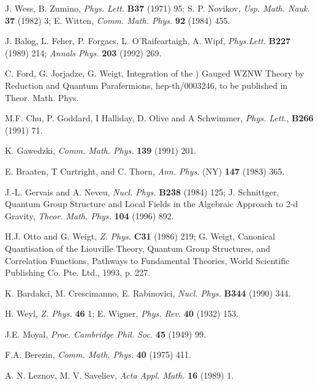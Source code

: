 \documentclass[a4paper,12pt]{article}
\providecommand{\rr}{\mathbb{R}}
\begin{document}
\vspace{0.5cm}

\begin{thebibliography}{xx}
\frenchspacing

 J. Wess, B. Zumino, {\it Phys. Lett.} {\bf B37} (1971)
  95; S. P. Novikov, {\it Usp. Math. Nauk.} {\bf 37} (1982) 3; E.
  Witten, {\it Comm. Math. Phys.} {\bf 92} (1984) 455.

 J. Balog, L. Feher, P. Forgacs, L.
  O'Raifeartaigh, A.  Wipf, {\it Phys.Lett.} {\bf B227} (1989) 214;
  {\it Annals Phys.} {\bf 203} (1992) 269.

 C. Ford, G. Jorjadze, G. Weigt, Integration of the
  \myHighlight{$SL(2,\rr)/U(1$}\coordHE{}) Gauged WZNW Theory by Reduction and Quantum
  Parafermions, hep-th/0003246, to be published in Theor. Math. Phys.

 M.F. Chu, P. Goddard, I Halliday, D. Olive and A
  Schwimmer, {\it Phys. Lett.}, {\bf B266} (1991) 71.

 K. Gawedzki, {\it Comm. Math. Phys.} {\bf
    139} (1991) 201.

 E. Braaten, T Curtright, and C. Thorn, {\it Ann.
    Phys.} (NY) {\bf 147} (1983) 365.

 J.-L. Gervais and A. Neveu, {\it Nucl. Phys.}{\bf
    B238} (1984) 125;  J. Schnittger,
  Quantum Group Structure and Local Fields in the Algebraic Approach
  to 2-d Gravity,  {\it Theor. Math.  Phys.} {\bf 104} (1996)
  892.

 H.J. Otto and G. Weigt, {\it Z. Phys.} {\bf C31} (1986)
  219; G. Weigt, Canonical Quantisation of the Liouville Theory,
  Quantum Group Structures, and Correlation Functions, Pathways to
  Fundamental Theories, World Scientific Publishing Co. Pte. Ltd.,
  1993, p. 227.

 K. Bardakci, M. Crescimanno, E. Rabinovici,
    {\it Nucl. Phys.} {\bf B344} (1990) 344.

 H. Weyl, {\it Z. Phys.} {\bf 46} 1; E. Wigner, {\it
    Phys. Rev.} {\bf 40} (1932) 153.

 J.E. Moyal, {\it Proc. Cambridge Phil. Soc.}  {\bf 45}
  (1949) 99.

 F.A. Berezin, {\it Comm. Math. Phys.} {\bf 40}
  (1975) 411.

 A. N. Leznov, M. V. Saveliev, {\it Acta Appl. Math.}
  {\bf 16} (1989) 1.


\end{thebibliography}
\end{document}
